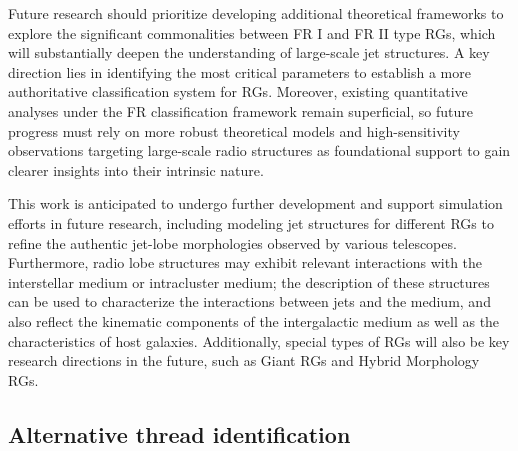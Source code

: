 \documentclass{aa}
\begin{document}
Future research should prioritize developing additional theoretical frameworks to explore the significant commonalities between FR I and FR II type RGs, which will substantially deepen the understanding of large-scale jet structures. A key direction lies in identifying the most critical parameters to establish a more authoritative classification system for RGs. Moreover, existing quantitative analyses under the FR classification framework remain superficial, so future progress must rely on more robust theoretical models and high-sensitivity observations targeting large-scale radio structures as foundational support to gain clearer insights into their intrinsic nature.


This work is anticipated to undergo further development and support simulation efforts in future research, including modeling jet structures for different RGs to refine the authentic jet-lobe morphologies observed by various telescopes. Furthermore, radio lobe structures may exhibit relevant interactions with the interstellar medium or intracluster medium; the description of these structures can be used to characterize the interactions between jets and the medium, and also reflect the kinematic components of the intergalactic medium as well as the characteristics of host galaxies. Additionally, special types of RGs will also be key research directions in the future, such as Giant RGs and Hybrid Morphology RGs.






% 
\begin{appendix}
\section{Alternative thread identification}\label{app:Alt} 




\end{appendix}
\end{document}
